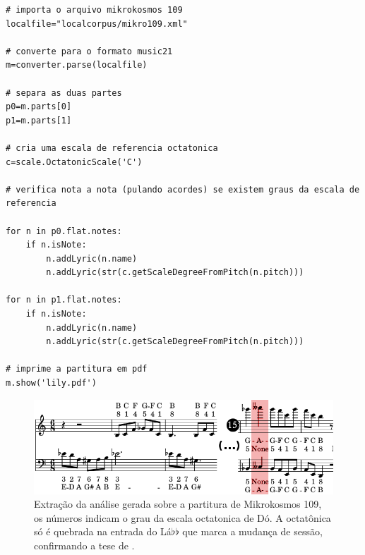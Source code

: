 \documentclass[
	12pt,				%
	openright,			%
	twoside,			%
	a4paper,			%
	english,			%
	french,				%
	spanish,			%
	brazil				%
	]{abntex2}
\begin{document}
\begin{lstlisting}
# importa o arquivo mikrokosmos 109
localfile="localcorpus/mikro109.xml"

# converte para o formato music21
m=converter.parse(localfile)

# separa as duas partes
p0=m.parts[0]
p1=m.parts[1]

# cria uma escala de referencia octatonica
c=scale.OctatonicScale('C')

# verifica nota a nota (pulando acordes) se existem graus da escala de referencia 

for n in p0.flat.notes:
	if n.isNote:
		n.addLyric(n.name)
		n.addLyric(str(c.getScaleDegreeFromPitch(n.pitch)))

for n in p1.flat.notes:
	if n.isNote:
		n.addLyric(n.name)
		n.addLyric(str(c.getScaleDegreeFromPitch(n.pitch)))			
			
# imprime a partitura em pdf
m.show('lily.pdf')		
\end{lstlisting}

\begin{figure}[!h]
	\caption{\label{fig_grafico} Extração da análise gerada sobre a partitura de Mikrokosmos 109, os números indicam o grau da escala octatonica de Dó. A octatônica só é quebrada na entrada do Lá$\flat\flat$ que marca a mudança de sessão, confirmando a tese de . } 
	\begin{center}
	    \includegraphics[scale=0.5]{octa/m109analisem21.png}
	\end{center}
\end{figure}




\end{document}
